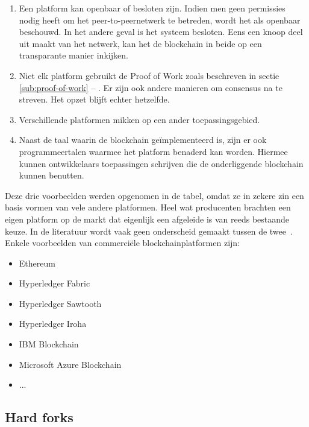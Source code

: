 \begin{enumerate}
	\item Een platform kan openbaar of besloten zijn. Indien men geen permissies nodig heeft om het peer-to-peernetwerk te betreden, wordt het als openbaar beschouwd. In het andere geval is het systeem besloten. Eens een knoop deel uit maakt van het netwerk, kan het de blockchain in beide op een transparante manier inkijken.
	\item Niet elk platform gebruikt de Proof of Work zoals beschreven in sectie \ref{sub:proof-of-work} -- . Er zijn ook andere manieren om consensus na te streven. Het opzet blijft echter hetzelfde.
	\item Verschillende platformen mikken op een ander toepassingsgebied.
	\item Naast de taal waarin de blockchain geïmplementeerd is, zijn er ook programmeertalen waarmee het platform benaderd kan worden. Hiermee kunnen ontwikkelaars toepassingen schrijven die de onderliggende blockchain kunnen benutten. 
\end{enumerate}
	
\pagebreak
	
Deze drie voorbeelden werden opgenomen in de tabel, omdat ze in zekere zin een basis vormen van vele andere platformen. Heel wat producenten brachten een eigen platform op de markt dat eigenlijk een afgeleide is van reeds bestaande keuze. In de literatuur wordt vaak geen onderscheid gemaakt tussen de twee~\autocite{Gartner2022}. Enkele voorbeelden van commerciële blockchainplatformen zijn:
\begin{itemize}
	\item Ethereum
	\item Hyperledger Fabric
	\item Hyperledger Sawtooth
	\item Hyperledger Iroha
	\item IBM Blockchain
	\item Microsoft Azure Blockchain
	\item ...
\end{itemize}

\subsection{Hard forks}
\label{sub:hard-forks}

